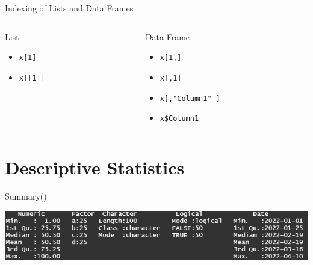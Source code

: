 \documentclass[aspectratio = 169]{chariteBeamer}
\begin{document}
\begin{frame}[fragile]{Indexing of Lists and Data Frames}
	
	\begin{columns}[T]
	\begin{column}{0.5\textwidth}
List
		\begin{itemize}
		\item \verb+x[1]+
		\item \verb+x[[1]]+
	\end{itemize}
	\end{column}
	\begin{column}{0.5\textwidth}
Data Frame
	\begin{itemize}
		\item  \verb+x[1,]+
		\item  \verb+x[,1]+
		\item  \verb+x[,"Column1" ]+
		\item  \verb+x$Column1+
	\end{itemize}
	\end{column}
\end{columns}

\end{frame}

\section{Descriptive Statistics}

\begin{frame}{Summary()}
	\begin{center}
		\includegraphics[scale=0.9]{Summary}
	\end{center}
\end{frame}
\end{document}
